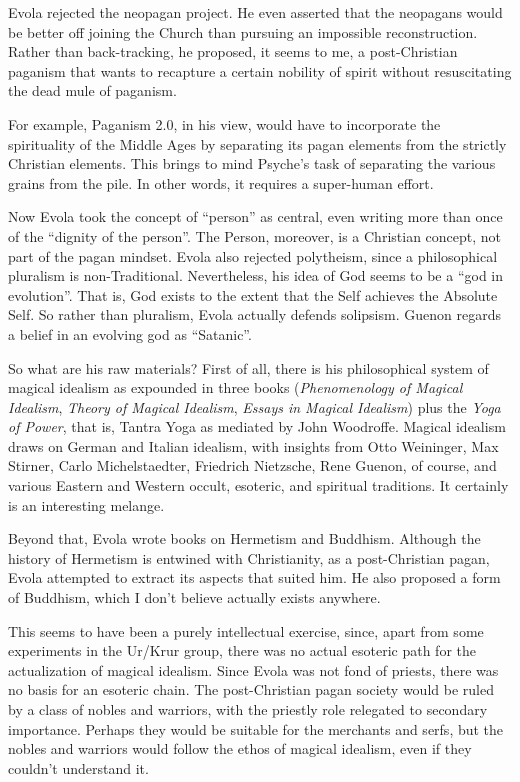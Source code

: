 Evola rejected the neopagan project. He even asserted that the neopagans would be better off joining the Church than pursuing an impossible reconstruction. Rather than back-tracking, he proposed, it seems to me, a post-Christian paganism that wants to recapture a certain nobility of spirit without resuscitating the dead mule of paganism.

For example, Paganism 2.0, in his view, would have to incorporate the spirituality of the Middle Ages by separating its pagan elements from the strictly Christian elements. This brings to mind Psyche's task of separating the various grains from the pile. In other words, it requires a super-human effort.

Now Evola took the concept of ``person'' as central, even writing more than once of the ``dignity of the person''. The Person, moreover, is a Christian concept, not part of the pagan mindset. Evola also rejected polytheism, since a philosophical pluralism is non-Traditional. Nevertheless, his idea of God seems to be a ``god in evolution''. That is, God exists to the extent that the Self achieves the Absolute Self. So rather than pluralism, Evola actually defends solipsism. Guenon regards a belief in an evolving god as ``Satanic''.

So what are his raw materials? First of all, there is his philosophical system of magical idealism as expounded in three books (\textit{Phenomenology of Magical Idealism}, \textit{Theory of Magical Idealism}, \textit{Essays in Magical Idealism}) plus the \textit{Yoga of Power}, that is, Tantra Yoga as mediated by John Woodroffe. Magical idealism draws on German and Italian idealism, with insights from Otto Weininger, Max Stirner, Carlo Michelstaedter, Friedrich Nietzsche, Rene Guenon, of course, and various Eastern and Western occult, esoteric, and spiritual traditions. It certainly is an interesting melange.

Beyond that, Evola wrote books on Hermetism and Buddhism. Although the history of Hermetism is entwined with Christianity, as a post-Christian pagan, Evola attempted to extract its aspects that suited him. He also proposed a form of Buddhism, which I don't believe actually exists anywhere.

This seems to have been a purely intellectual exercise, since, apart from some experiments in the Ur/Krur group, there was no actual esoteric path for the actualization of magical idealism. Since Evola was not fond of priests, there was no basis for an esoteric chain. The post-Christian pagan society would be ruled by a class of nobles and warriors, with the priestly role relegated to secondary importance. Perhaps they would be suitable for the merchants and serfs, but the nobles and warriors would follow the ethos of magical idealism, even if they couldn't understand it.

